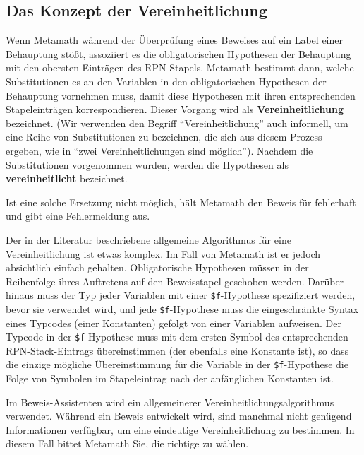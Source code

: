 \subsection{Das Konzept der Vereinheitlichung} \label{unify}

Wenn Metamath während der Überprüfung eines Beweises auf ein Label einer Behauptung stößt, assoziiert es die obligatorischen Hypothesen der Behauptung mit den obersten Einträgen des RPN-Stapels.  Metamath bestimmt dann, welche Substitutionen es an den Variablen in den obligatorischen Hypothesen der Behauptung vornehmen muss, damit diese Hypothesen mit ihren entsprechenden Stapeleinträgen korrespondieren.  Dieser Vorgang wird als {\bf Vereinheitlichung} bezeichnet.  (Wir verwenden den Begriff "`Vereinheitlichung"' auch informell, um eine Reihe von Substitutionen zu bezeichnen, die sich aus diesem Prozess ergeben, wie in "`zwei Vereinheitlichungen sind möglich"').  Nachdem die Substitutionen vorgenommen wurden, werden die Hypothesen als {\bf vereinheitlicht} bezeichnet.

Ist eine solche Ersetzung nicht möglich, hält Metamath den Beweis für fehlerhaft und gibt eine Fehlermeldung aus.

Der in der Literatur beschriebene allgemeine Algorithmus für eine Vereinheitlichung ist etwas komplex. Im Fall von Metamath ist er jedoch absichtlich einfach gehalten. Obligatorische Hypothesen müssen in der Reihenfolge ihres Auftretens auf den Beweisstapel geschoben werden. Darüber hinaus muss der Typ jeder Variablen mit einer \texttt{\$f}-Hypothese spezifiziert werden, bevor sie verwendet wird, und jede \texttt{\$f}-Hypothese muss die eingeschränkte Syntax eines Typcodes (einer Konstanten) gefolgt von einer Variablen aufweisen. Der Typcode in der \texttt{\$f}-Hypothese muss mit dem ersten Symbol des entsprechenden RPN-Stack-Eintrags übereinstimmen (der ebenfalls eine Konstante ist), so dass die einzige mögliche Übereinstimmung für die Variable in der \texttt{\$f}-Hypothese die Folge von Symbolen im Stapeleintrag nach der anfänglichen Konstanten ist. 

Im Beweis-Assistenten wird ein allgemeinerer Vereinheitlichungsalgorithmus verwendet.  Während ein Beweis entwickelt wird, sind manchmal nicht genügend Informationen verfügbar, um eine eindeutige Vereinheitlichung zu bestimmen.  In diesem Fall bittet Metamath Sie, die richtige zu wählen. 

